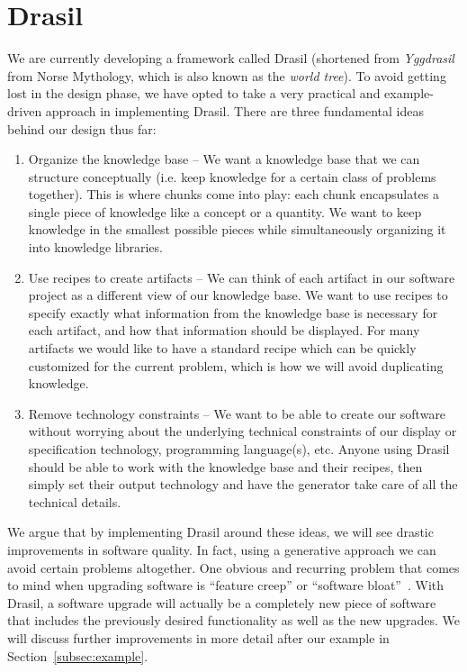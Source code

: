 \documentclass[preprint, 10pt]{sigplanconf}
\begin{document}
\section{Drasil}
\label{sec:Drasil}

We are currently developing a framework called Drasil (shortened from
\emph{Yggdrasil} from Norse Mythology, which is also known as the \emph{world
tree}). To avoid getting lost in the design phase, we have opted to take a very
practical and example-driven approach in implementing Drasil. There are three
fundamental ideas behind our design thus far:

\begin{enumerate}
\item Organize the knowledge base -- We want a knowledge base that we can
structure conceptually (i.e. keep knowledge for a certain class of problems
together). This is where chunks come into play: each chunk encapsulates a single
piece of knowledge like a concept or a quantity. We want to keep knowledge in
the smallest possible pieces while simultaneously organizing it into knowledge
libraries.

\item Use recipes to create artifacts -- We can think of each artifact in our
software project as a different view of our knowledge base. We want to use
recipes to specify exactly what information from the knowledge base is necessary
for each artifact, and how that information should be displayed. For many
artifacts we would like to have a standard recipe which can be quickly
customized for the current problem, which is how we will avoid duplicating
knowledge.

\item Remove technology constraints -- We want to be able to create our software
without worrying about the underlying technical constraints of our display or
specification technology, programming language(s), etc. Anyone using Drasil
should be able to work with the knowledge base and their recipes, then simply
set their output technology and have the generator take care of all the
technical details.
\end{enumerate}

We argue that by implementing Drasil around these ideas, we will see drastic
improvements in software quality. In fact, using a generative approach we can
avoid certain problems altogether. One obvious and recurring problem that comes
to mind when upgrading software is ``feature creep'' or ``software
bloat''~\cite{AmselEtAl2011}. With Drasil, a software upgrade will actually be a
completely new piece of software that includes the previously desired
functionality as well as the new upgrades. We will discuss further improvements
in more detail after our example in Section~\ref{subsec:example}.
\end{document}
